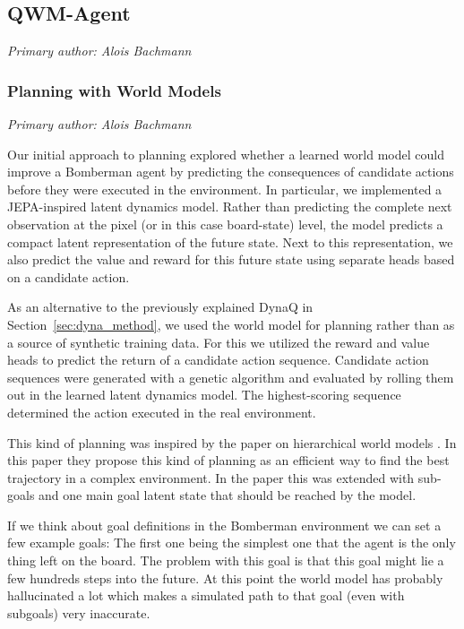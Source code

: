 \subsection{QWM-Agent}\label{sec:qwm_agent}

\textit{Primary author: Alois Bachmann}

\subsubsection{Planning with World Models}

\textit{Primary author: Alois Bachmann}

Our initial approach to planning explored whether a learned world model could improve a Bomberman agent by predicting the consequences of candidate actions before they were executed in the environment. In particular, we implemented a JEPA-inspired latent dynamics model. Rather than predicting the complete next observation at the pixel (or in this case board-state) level, the model predicts a compact latent representation of the future state. Next to this representation, we also predict the value and reward for this future state using separate heads based on a candidate action. 

As an alternative to the previously explained DynaQ in Section~\ref{sec:dyna_method}, we used the world model for planning rather than as a source of synthetic training data. For this we utilized the reward and value heads to predict the return of a candidate action sequence. Candidate action sequences were generated with a genetic algorithm and evaluated by rolling them out in the learned latent dynamics model. The highest-scoring sequence determined the action executed in the real environment. 

This kind of planning was inspired by the paper on hierarchical world models \cite{zhang2026hwm}. In this paper they propose this kind of planning as an efficient way to find the best trajectory in a complex environment. In the paper this was extended with sub-goals and one main goal latent state that should be reached by the model. 

If we think about goal definitions in the Bomberman environment we can set a few example goals: The first one being the simplest one that the agent is the only thing left on the board. The problem with this goal is that this goal might lie a few hundreds steps into the future. At this point the world model has probably hallucinated a lot which makes a simulated path to that goal (even with subgoals) very inaccurate. 

